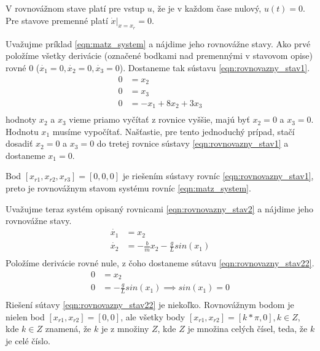 \documentclass[../main.tex]{subfiles}
\begin{document}
V rovnovážnom stave platí pre vstup $u$, že je v každom čase nulový, $u(t)=0$. Pre stavove premenné platí $\dot{x}|_{x = x_r} = 0$.

Uvažujme príklad \ref{eqn:matz_system} a nájdime jeho rovnovážne stavy. Ako prvé položíme všetky derivácie (označené bodkami nad premennými v stavovom opise) rovné 0 ($\dot{x_1} = 0,\dot{x_2} = 0,\dot{x_3} = 0$). Dostaneme tak sústavu \ref{eqn:rovnovazny_stav1}.
\begin{equation}
	\begin{aligned}
        0 &= x_2 \\
		0 &= x_3 \\
		0 &= -x_1 + 8x_2 + 3x_3\\
	\end{aligned}
	\label{eqn:rovnovazny_stav1}
\end{equation}
hodnoty $x_2$ a $x_3$ vieme priamo vyčítať z rovnice vyššie, majú byť $x_2=0$ a $x_3=0$. Hodnotu $x_1$ musíme vypočítať. Našťastie, pre tento jednoduchý prípad, stačí dosadiť $x_2=0$ a $x_3=0$ do tretej rovnice sústavy \ref{eqn:rovnovazny_stav1} a dostaneme $x_1=0$.

Bod $[x_{r1},x_{r2},x_{r3}] = [0,0,0]$ je riešením sústavy rovníc \ref{eqn:rovnovazny_stav1}, preto je rovnovážnym stavom systému rovníc \ref{eqn:matz_system}.

Uvažujme teraz systém opisaný rovnicami \ref{eqn:rovnovazny_stav2} a nájdime jeho rovnovážne stavy.
\begin{equation}
	\begin{aligned}
        \dot{x_1} &= x_2 \\
		\dot{x_2} &= -\frac{b}{m}x_2-\frac{g}{L}sin(x_1) \\
	\end{aligned}
	\label{eqn:rovnovazny_stav2}
\end{equation}
Položíme derivácie rovné nule, z čoho dostaneme sútavu \ref{eqn:rovnovazny_stav22}.
\begin{equation}
	\begin{aligned}
        0 &= x_2 \\
		0 &= -\frac{g}{L}sin(x_1) \implies sin(x_1) = 0\\
	\end{aligned}
	\label{eqn:rovnovazny_stav22}
\end{equation}
Riešení sútavy \ref{eqn:rovnovazny_stav22} je niekoľko. Rovnovážnym bodom je nielen bod $[x_{r1},x_{r2}] = [0,0]$, ale všetky body $[x_{r1},x_{r2}] = [k*\pi,0],k \in Z$, kde $k \in Z$ znamená, že $k$ je z množiny $Z$, kde $Z$ je množina celých čísel, teda, že $k$ je celé číslo.
	
\end{document}
